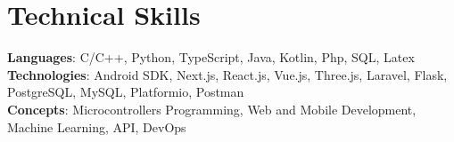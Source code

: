 \section{Technical Skills}
    \begin{itemize}[leftmargin=0.15in, label={}]
	\small{\item{
		\textbf{Languages}{: C/C++, Python, TypeScript, Java, Kotlin, Php, SQL, Latex} \\
		\textbf{Technologies}{: Android SDK, Next.js, React.js, Vue.js, Three.js, Laravel, Flask, PostgreSQL, MySQL, Platformio, Postman} \\
		\textbf{Concepts}{: Microcontrollers Programming, Web and Mobile Development, Machine Learning, API, DevOps}
	}}
    \end{itemize}